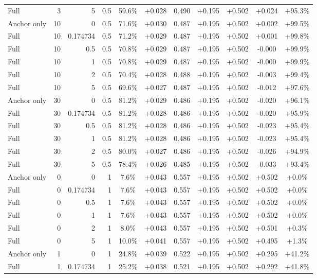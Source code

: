 \begin{table}[htbp]
\begin{tabular}{lrrrccccccc}
Full & 3 & 5 & 0.5 & 59.6\% & +0.028 & 0.490 & +0.195 & +0.502 & +0.024 & +95.3\% \\
Anchor only & 10 & 0 & 0.5 & 71.6\% & +0.030 & 0.487 & +0.195 & +0.502 & +0.002 & +99.5\% \\
Full & 10 & 0.174734 & 0.5 & 71.2\% & +0.029 & 0.487 & +0.195 & +0.502 & +0.001 & +99.8\% \\
Full & 10 & 0.5 & 0.5 & 70.8\% & +0.029 & 0.487 & +0.195 & +0.502 & -0.000 & +99.9\% \\
Full & 10 & 1 & 0.5 & 70.8\% & +0.029 & 0.487 & +0.195 & +0.502 & -0.000 & +99.9\% \\
Full & 10 & 2 & 0.5 & 70.4\% & +0.028 & 0.488 & +0.195 & +0.502 & -0.003 & +99.4\% \\
Full & 10 & 5 & 0.5 & 69.6\% & +0.027 & 0.487 & +0.195 & +0.502 & -0.012 & +97.6\% \\
Anchor only & 30 & 0 & 0.5 & 81.2\% & +0.029 & 0.486 & +0.195 & +0.502 & -0.020 & +96.1\% \\
Full & 30 & 0.174734 & 0.5 & 81.2\% & +0.028 & 0.486 & +0.195 & +0.502 & -0.020 & +95.9\% \\
Full & 30 & 0.5 & 0.5 & 81.2\% & +0.028 & 0.486 & +0.195 & +0.502 & -0.023 & +95.4\% \\
Full & 30 & 1 & 0.5 & 81.2\% & +0.028 & 0.486 & +0.195 & +0.502 & -0.023 & +95.4\% \\
Full & 30 & 2 & 0.5 & 80.0\% & +0.027 & 0.486 & +0.195 & +0.502 & -0.026 & +94.9\% \\
Full & 30 & 5 & 0.5 & 78.4\% & +0.026 & 0.485 & +0.195 & +0.502 & -0.033 & +93.4\% \\
Anchor only & 0 & 0 & 1 & 7.6\% & +0.043 & 0.557 & +0.195 & +0.502 & +0.502 & +0.0\% \\
Full & 0 & 0.174734 & 1 & 7.6\% & +0.043 & 0.557 & +0.195 & +0.502 & +0.502 & +0.0\% \\
Full & 0 & 0.5 & 1 & 7.6\% & +0.043 & 0.557 & +0.195 & +0.502 & +0.502 & +0.0\% \\
Full & 0 & 1 & 1 & 7.6\% & +0.043 & 0.557 & +0.195 & +0.502 & +0.502 & +0.0\% \\
Full & 0 & 2 & 1 & 8.0\% & +0.043 & 0.557 & +0.195 & +0.502 & +0.501 & +0.3\% \\
Full & 0 & 5 & 1 & 10.0\% & +0.041 & 0.557 & +0.195 & +0.502 & +0.495 & +1.3\% \\
Anchor only & 1 & 0 & 1 & 24.8\% & +0.039 & 0.522 & +0.195 & +0.502 & +0.295 & +41.2\% \\
Full & 1 & 0.174734 & 1 & 25.2\% & +0.038 & 0.521 & +0.195 & +0.502 & +0.292 & +41.8\% \\

\end{tabular}
\end{table}
